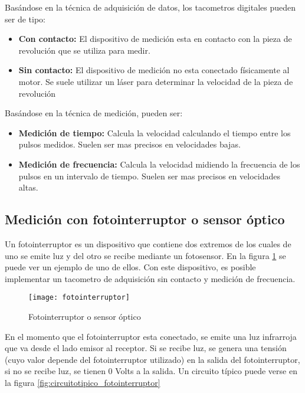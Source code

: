 Basándose en la técnica de adquisición de datos, los tacometros digitales pueden ser de tipo:

\begin{itemize}
  \item \textbf{Con contacto:} El dispositivo de medición esta en contacto con la pieza de revolución que se utiliza para medir. 
  \item \textbf{Sin contacto:} El dispositivo de medición no esta conectado físicamente al motor. Se suele utilizar un láser para determinar la velocidad de la pieza de revolución
\end{itemize}

Basándose en la técnica de medición, pueden ser:

\begin{itemize}
  \item \textbf{Medición de tiempo:} Calcula la velocidad calculando el tiempo entre los pulsos medidos. Suelen ser mas precisos en velocidades bajas.
  \item \textbf{Medición de frecuencia:} Calcula la velocidad midiendo la frecuencia de los pulsos en un intervalo de tiempo. Suelen ser mas precisos en velocidades altas.
\end{itemize}

\subsection{Medición con fotointerruptor o sensor óptico} %
\label{sub:medicion_con_fotointerruptor_o_sensor_optico}

Un fotointerruptor es un dispositivo que contiene dos extremos de los cuales de uno se emite luz y del otro se recibe mediante un fotosensor. En la figura \ref{fig:fotointerruptor} se puede ver un ejemplo de uno de ellos. Con este dispositivo, es posible implementar un tacometro de adquisición sin contacto y medición de frecuencia.\cite{slotted_sensor}

\begin{figure}[h]
  \centering
  \texttt{[image: fotointerruptor]}
  \caption{Fotointerruptor o sensor óptico}\label{fig:fotointerruptor}
\end{figure}

En el momento que el fotointerruptor esta conectado, se emite una luz infrarroja que va desde el lado emisor al receptor. Si se recibe luz, se genera una tensión (cuyo valor depende del fotointerruptor utilizado) en la salida del fotointerruptor, si no se recibe luz, se tienen 0 Volts a la salida. Un circuito típico puede verse en la figura \ref{fig:circuitotipico_fotointerruptor} \\

